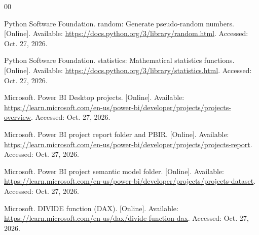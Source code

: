 \documentclass[conference,letterpaper]{IEEEtran}
\begin{document}
\balance
\begin{thebibliography}{00}

 Python Software Foundation. random: Generate pseudo-random numbers. [Online]. Available: \url{https://docs.python.org/3/library/random.html}. Accessed: Oct. 27, 2026.

 Python Software Foundation. statistics: Mathematical statistics functions. [Online]. Available: \url{https://docs.python.org/3/library/statistics.html}. Accessed: Oct. 27, 2026.

 Microsoft. Power BI Desktop projects. [Online]. Available: \url{https://learn.microsoft.com/en-us/power-bi/developer/projects/projects-overview}. Accessed: Oct. 27, 2026.

 Microsoft. Power BI project report folder and PBIR. [Online]. Available: \url{https://learn.microsoft.com/en-us/power-bi/developer/projects/projects-report}. Accessed: Oct. 27, 2026.

 Microsoft. Power BI project semantic model folder. [Online]. Available: \url{https://learn.microsoft.com/en-us/power-bi/developer/projects/projects-dataset}. Accessed: Oct. 27, 2026.

 Microsoft. DIVIDE function (DAX). [Online]. Available: \url{https://learn.microsoft.com/en-us/dax/divide-function-dax}. Accessed: Oct. 27, 2026.

\end{thebibliography}
\end{document}
